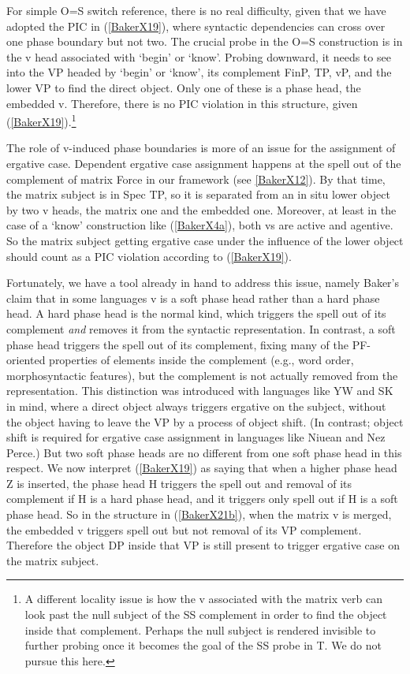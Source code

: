 \documentclass[output=paper]{langscibook}
\begin{document}
For simple O=S switch reference, there is no real difficulty, given that we have adopted the PIC in (\ref{BakerX19}), where syntactic dependencies can cross over one phase boundary but not two. The crucial probe in the O=S construction is in the v head associated with ‘begin’ or ‘know’. Probing downward, it needs to see into the VP headed by ‘begin’ or ‘know’, its complement FinP, TP, vP, and the lower VP to find the direct object. Only one of these is a phase head, the embedded v. Therefore, there is no PIC violation in this structure, given (\ref{BakerX19}).\footnote{A different locality issue is how the v associated with the matrix verb can look past the null subject of the SS complement in order to find the object inside that complement. Perhaps the null subject is rendered invisible to further probing once it becomes the goal of the SS probe in T. We do not pursue this here.}

The role of v-induced phase boundaries is more of an issue for the assignment of ergative case. Dependent ergative case assignment happens at the spell out of the complement of matrix Force in our framework (see \ref{BakerX12}). By that time, the matrix subject is in Spec TP, so it is separated from an in situ lower object by two v heads, the matrix one and the embedded one. Moreover, at least in the case of a `know’ construction like (\ref{BakerX4a}), both vs are active and agentive. So the matrix subject getting ergative case under the influence of the lower object should count as a PIC violation according to (\ref{BakerX19}).

\begin{sloppypar}
Fortunately, we have a tool already in hand to address this issue, namely Baker’s \citeyearpar{baker2015case} claim that in some languages v is a soft phase head rather than a hard phase head. A hard phase head is the normal kind, which triggers the spell out of its complement \textit{and} removes it from the syntactic representation. In contrast, a soft phase head triggers the spell out of its complement, fixing many of the PF-oriented properties of elements inside the complement (e.g., word order, morphosyntactic features), but the complement is not actually removed from the representation. This distinction was introduced with languages like YW and SK in mind, where a direct object always triggers ergative on the subject, without the object having to leave the VP by a process of object shift. (In contrast; object shift is required for ergative case assignment in languages like Niuean and Nez Perce.) But two soft phase heads are no different from one soft phase head in this respect. We now interpret (\ref{BakerX19}) as saying that when a higher phase head Z is inserted, the phase head H triggers the spell out and removal of its complement if H is a hard phase head, and it triggers only spell out if H is a soft phase head. So in the structure in (\ref{BakerX21b}), when the matrix v is merged, the embedded v triggers spell out but not removal of its VP complement. Therefore the object DP inside that VP is still present to trigger ergative case on the matrix subject.
\end{sloppypar}
\end{document}

